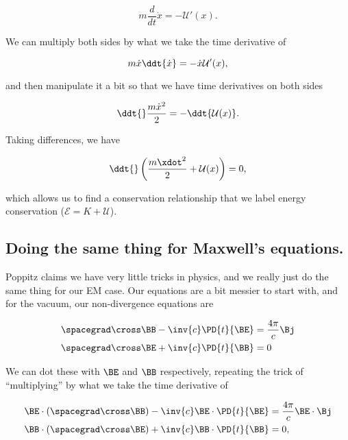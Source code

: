 \begin{equation}\label{eqn:relativisticElectrodynamicsL16:450}
m \frac{d}{dt} \dot{x} = - \mathcal{U}'(x).
\end{equation}

We can multiply both sides by what we take the time derivative of

\begin{equation}\label{eqn:relativisticElectrodynamicsL16:470}
m \dot{x} \ddt{\dot{x}} = - \dot{x} \mathcal{U}'(x),
\end{equation}

and then manipulate it a bit so that we have time derivatives on both sides

\begin{equation}\label{eqn:relativisticElectrodynamicsL16:490}
\ddt{} \frac{m \dot{x}^2}{2} = - \ddt{ \mathcal{U}(x) }.
\end{equation}

Taking differences, we have

\begin{equation}\label{eqn:relativisticElectrodynamicsL16:510}
\ddt{} \left( \frac{m \xdot^2}{2} + \mathcal{U}(x) \right) = 0,
\end{equation}

which allows us to find a conservation relationship that we label energy conservation ($\mathcal{E} = K + \mathcal{U}$).

\subsection{Doing the same thing for Maxwell's equations.}

Poppitz claims we have very little tricks in physics, and we really just do the same thing for our EM case.  Our equations are a bit messier to start with, and for the vacuum, our non-divergence equations are

\begin{align}\label{eqn:relativisticElectrodynamicsL16:530}
\spacegrad \cross \BB -\inv{c} \PD{t}{\BE} &= \frac{4 \pi}{c} \Bj \\
\spacegrad \cross \BE +\inv{c} \PD{t}{\BB} &= 0
\end{align}

We can dot these with $\BE$ and $\BB$ respectively, repeating the trick of ``multiplying'' by what we take the time derivative of

\begin{align}\label{eqn:relativisticElectrodynamicsL16:550}
\BE \cdot (\spacegrad \cross \BB) -\inv{c} \BE \cdot \PD{t}{\BE} &= \frac{4 \pi}{c} \BE \cdot \Bj \\
\BB \cdot (\spacegrad \cross \BE) +\inv{c} \BB \cdot \PD{t}{\BB} &= 0,
\end{align}

